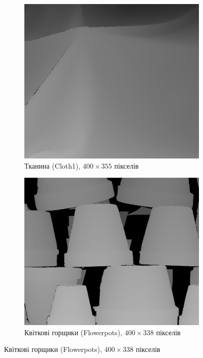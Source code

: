 \begin{figure}[h]
    \begin{subfigure}[t]{0.32\textwidth}
        \centering
        \includegraphics[width=\textwidth]{images/cloth_ground_truth}
        \caption{Тканина (Cloth1), $400 \times 355$ пікселів}
    \end{subfigure}
    \hfill
    \begin{subfigure}[t]{0.32\textwidth}
        \centering
        \includegraphics[width=\textwidth]{images/pots_ground_truth}
        \caption{Квіткові горщики (Flowerpots), $400 \times 338$ пікселів}

\end{subfigure}
\end{figure}

